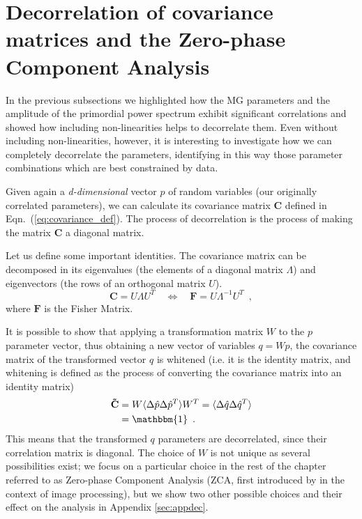 \section{Decorrelation of covariance matrices and the Zero-phase Component Analysis \label{sec:Decorrelation-of-covariance}}

In the previous subsections we highlighted how the MG parameters and the 
amplitude of the primordial power spectrum exhibit significant correlations and showed how including non-linearities helps to decorrelate them. Even without including non-linearities, however, it is interesting to investigate how we can completely decorrelate the parameters, identifying in this way those parameter combinations which are best constrained by data.

Given again a \emph{d-dimensional} vector
$p$ of random variables (our originally correlated parameters), we can calculate its covariance matrix $\mathbf C$ defined in Eqn.\ (\ref{eq:covariance_def}). The process of decorrelation is the process of making the matrix $\mathbf C$ 
a diagonal matrix.

Let us define some important identities. The covariance
matrix can be decomposed in its eigenvalues (the elements of a diagonal matrix $\Lambda$) and eigenvectors
(the rows of an orthogonal matrix $U$).
\begin{equation}
\mathbf C=U\Lambda U^{T} \quad \Leftrightarrow \quad 
\mathbf F=U\Lambda^{-1}U^{T} \,\,\, ,
\label{eq:eigensystemofC}
\end{equation}
where $\mathbf F$ is the Fisher Matrix.

It is possible to show that applying a transformation matrix $W$ to the $p$ parameter vector, thus obtaining a new vector of variables $q=Wp$, the covariance matrix of the transformed vector $q$ is whitened (i.e. it is the identity matrix, and whitening is defined as the process
of converting the covariance matrix into an identity matrix)
\begin{align}
\mathbf {\tilde{C}} & =W\langle\Delta\hat{p}\Delta\hat{p}^{T}\rangle W^{T} =\langle\Delta\hat{q}\Delta\hat{q}^{T}\rangle \label{eq:Cwhitened}\\
 & = \mathbbm{1} \,\,\, . \nonumber
\end{align} 
This means that the transformed $q$ parameters are decorrelated, since their correlation matrix is diagonal. The choice of $W$ 
is not unique as several  possibilities
exist; we focus on a particular choice in the rest of the chapter referred to as Zero-phase Component Analysis (ZCA, first 
introduced by \cite{Bell19973327} in the context of image processing), but we show
two other possible choices and their effect on the analysis in Appendix
\ref{sec:appdec}.

